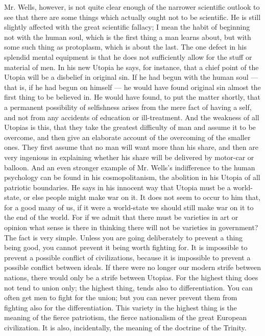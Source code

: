Mr. Wells, however, is not quite clear enough of the narrower scientific outlook to see that there are some things which actually ought not to be scientific. He is still slightly affected with the great scientific fallacy; I mean the habit of beginning not with the human soul, which is the first thing a man learns about, but with some such thing as protoplasm, which is about the last. The one defect in his splendid mental equipment is that he does not sufficiently allow for the stuff or material of men. In his new Utopia he says, for instance, that a chief point of the Utopia will be a disbelief in original sin. If he had begun with the human soul — that is, if he had begun on himself — he would have found original sin almost the first thing to be believed in. He would have found, to put the matter shortly, that a permanent possibility of selfishness arises from the mere fact of having a self, and not from any accidents of education or ill-treatment. And the weakness of all Utopias is this, that they take the greatest difficulty of man and assume it to be overcome, and then give an elaborate account of the overcoming of the smaller ones. They first assume that no man will want more than his share, and then are very ingenious in explaining whether his share will be delivered by motor-car or balloon. And an even stronger example of Mr. Wells’s indifference to the human psychology can be found in his cosmopolitanism, the abolition in his Utopia of all patriotic boundaries. He says in his innocent way that Utopia must be a world-state, or else people might make war on it. It does not seem to occur to him that, for a good many of us, if it were a world-state we should still make war on it to the end of the world. For if we admit that there must be varieties in art or opinion what sense is there in thinking there will not be varieties in government? The fact is very simple. Unless you are going deliberately to prevent a thing being good, you cannot prevent it being worth fighting for. It is impossible to prevent a possible conflict of civilizations, because it is impossible to prevent a possible conflict between ideals. If there were no longer our modern strife between nations, there would only be a strife between Utopias. For the highest thing does not tend to union only; the highest thing, tends also to differentiation. You can often get men to fight for the union; but you can never prevent them from fighting also for the differentiation. This variety in the highest thing is the meaning of the fierce patriotism, the fierce nationalism of the great European civilization. It is also, incidentally, the meaning of the doctrine of the Trinity.

